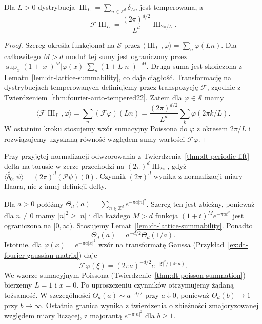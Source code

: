 \begin{wniosek}
\label{cor:dt-dirac-comb-fourier}
Dla $L>0$ dystrybucja
$\operatorname{III}_L=\sum_{n\in\mathbb Z^d}\delta_{Ln}$
jest temperowana, a
\[
 \mathcal F\operatorname{III}_L
 =\frac{(2\pi)^{d/2}}{L^d}
 \operatorname{III}_{2\pi/L}.
\]
\end{wniosek}
\begin{proof}
Szereg określa funkcjonał na $\mathcal S$ przez
$\langle\operatorname{III}_L,\varphi\rangle
=\sum_n\varphi(Ln)$.
Dla całkowitego $M>d$ moduł tej sumy
jest ograniczony przez
$\sup_x(1+|x|)^M|\varphi(x)|
\sum_n(1+L|n|)^{-M}$.
Druga suma jest skończona z
Lematu~\ref{lem:dt-lattice-summability},
co daje ciągłość.
Transformację na dystrybucjach temperowanych
definiujemy przez transpozycję $\mathcal F$,
zgodnie z Twierdzeniem~\ref{thm:fourier-auto-tempered22}.
Zatem dla $\varphi\in\mathcal S$ mamy
\[
 \langle\mathcal F\operatorname{III}_L,\varphi\rangle
 =\sum_n(\mathcal F\varphi)(Ln)
 =\frac{(2\pi)^{d/2}}{L^d}\sum_k\varphi(2\pi k/L).
\]
W ostatnim kroku stosujemy wzór sumacyjny
Poissona do $\varphi$ z okresem $2\pi/L$
i rozwiązujemy uzyskaną równość względem sumy
wartości $\mathcal F\varphi$.
\end{proof}

\begin{uwaga}
Przy przyjętej normalizacji odwzorowania
z Twierdzenia~\ref{thm:dt-periodic-lift}
delta na torusie w zerze przechodzi na
$(2\pi)^d\operatorname{III}_{2\pi}$,
gdyż $\langle\widetilde{\delta_0},\psi\rangle
=(2\pi)^d(\mathcal P\psi)(0)$.
Czynnik $(2\pi)^d$ wynika z normalizacji
miary Haara, nie z innej definicji delty.
\end{uwaga}


\begin{przyklad}
\label{ex:dt-poisson-theta}
Dla $a>0$ połóżmy
$\Theta_d(a)=\sum_{n\in\mathbb Z^d}e^{-\pi a|n|^2}$.
Szereg ten jest zbieżny, ponieważ dla $n\ne0$
mamy $|n|^2\ge |n|$ i dla każdego $M>d$
funkcja $(1+t)^M e^{-\pi a t^2}$ jest ograniczona
na $[0,\infty)$. Stosujemy
Lemat~\ref{lem:dt-lattice-summability}. Ponadto
\[
 \Theta_d(a)=a^{-d/2}\Theta_d(1/a).
\]
Istotnie, dla $\varphi(x)=e^{-\pi a|x|^2}$
wzór na transformatę Gaussa
(Przykład~\ref{ex:dt-fourier-gaussian-matrix})
daje
\[
 \mathcal F\varphi(\xi)=(2\pi a)^{-d/2}
 e^{-|\xi|^2/(4\pi a)}.
\]
We wzorze sumacyjnym Poissona
(Twierdzenie~\ref{thm:dt-poisson-summation})
bierzemy $L=1$ i $x=0$. Po uproszczeniu
czynników otrzymujemy żądaną tożsamość.
W szczególności $\Theta_d(a)\sim a^{-d/2}$
przy $a\downarrow0$, ponieważ
$\Theta_d(b)\to1$ przy $b\to\infty$.
Ostatnia granica wynika z twierdzenia
o zbieżności zmajoryzowanej względem miary
liczącej, z majorantą $e^{-\pi|n|^2}$ dla $b\ge1$.
\end{przyklad}

